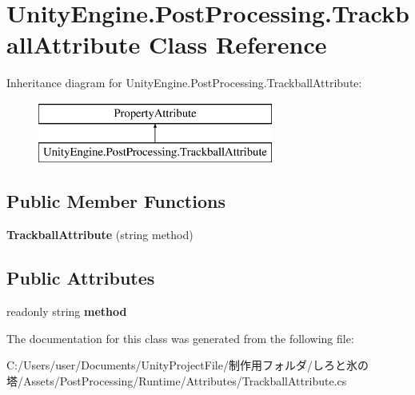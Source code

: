 \hypertarget{class_unity_engine_1_1_post_processing_1_1_trackball_attribute}{}\section{Unity\+Engine.\+Post\+Processing.\+Trackball\+Attribute Class Reference}
\label{class_unity_engine_1_1_post_processing_1_1_trackball_attribute}
Inheritance diagram for Unity\+Engine.\+Post\+Processing.\+Trackball\+Attribute\+:\begin{figure}[H]
\begin{center}
\leavevmode
\includegraphics[height=2.000000cm]{class_unity_engine_1_1_post_processing_1_1_trackball_attribute}
\end{center}
\end{figure}
\subsection*{Public Member Functions}
\begin{DoxyCompactItemize}
\item 
\mbox{\label{class_unity_engine_1_1_post_processing_1_1_trackball_attribute_a52191c242795edb5e0a72fabaa9e5978}} 
{\bfseries Trackball\+Attribute} (string method)
\end{DoxyCompactItemize}
\subsection*{Public Attributes}
\begin{DoxyCompactItemize}
\item 
\mbox{\label{class_unity_engine_1_1_post_processing_1_1_trackball_attribute_a221e0ff9fe5396c91114a43ee8314616}} 
readonly string {\bfseries method}
\end{DoxyCompactItemize}


The documentation for this class was generated from the following file\+:\begin{DoxyCompactItemize}
\item 
C\+:/\+Users/user/\+Documents/\+Unity\+Project\+File/制作用フォルダ/しろと氷の塔/\+Assets/\+Post\+Processing/\+Runtime/\+Attributes/Trackball\+Attribute.\+cs\end{DoxyCompactItemize}
